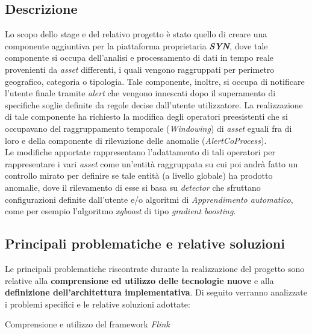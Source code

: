 \subsection{Descrizione}

Lo scopo dello stage e del relativo progetto è stato quello di creare una componente aggiuntiva per la piattaforma proprietaria \textbf{\textit{SYN}}, dove tale componente si occupa dell'analisi e processamento di dati in tempo reale provenienti da \textit{asset} differenti, i quali vengono raggruppati per perimetro geografico, categoria o tipologia. Tale componente, inoltre,
si occupa di notificare l'utente finale tramite \textit{alert} che vengono innescati dopo il superamento di specifiche soglie definite da regole decise dall'utente utilizzatore.
La realizzazione di tale componente ha richiesto la modifica degli operatori preesistenti che si occupavano del raggruppamento temporale (\textit{Windowing}) di \textit{asset} eguali fra di loro e della componente di rilevazione delle anomalie (\textit{AlertCoProcess}).\\
Le modifiche apportate rappresentano l'adattamento di tali operatori per rappresentare i vari \textit{asset} come un'entità raggruppata su cui poi andrà fatto un controllo mirato per definire se tale entità (a livello globale) ha prodotto anomalie, dove il rilevamento di esse si basa su \textit{detector} che sfruttano configurazioni definite dall'utente e/o algoritmi di \textit{\gls{Apprendimento automatico}}, come per esempio l'algoritmo \textit{\gls{xgboost}} di tipo \textit{\gls{gradient boosting}}.


\subsection{Principali problematiche e relative soluzioni}
Le principali problematiche riscontrate durante la realizzazione del progetto sono relative alla \textbf{comprensione ed utilizzo delle tecnologie nuove} e alla \textbf{definizione dell'architettura implementativa}. Di seguito verranno analizzate i problemi specifici e le relative soluzioni adottate:\\

\begin{risk}{Comprensione e utilizzo del framework \textit{Flink}}
    \label{risk:flinkImport}
\end{risk}

